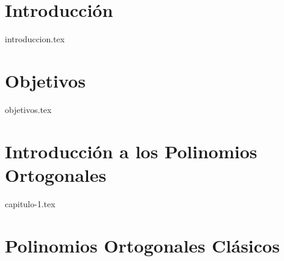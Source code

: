 \documentclass[twoside,openright,11pt]{report}
\begin{document}
\begin{comment}
    

\chapter*{Lista de Abreviaturas}

{lista-abreviaturas.tex}
\addcontentsline{toc}{chapter}{Lista de Abreviaturas}

\listoffigures
\thispagestyle{plain}
\addcontentsline{toc}{chapter}{Lista de Imágenes}


\end{comment}




\chapter*{Introducción}

{introduccion.tex}

\chapter*{Objetivos}
\label{chap:Objetivos}

{objetivos.tex}

\chapter{Introducción a los Polinomios Ortogonales}
\label{chap:introduccionPO}

{capitulo-1.tex}

\chapter{Polinomios Ortogonales Clásicos}
\label{chap:clasicos}
\end{document}
